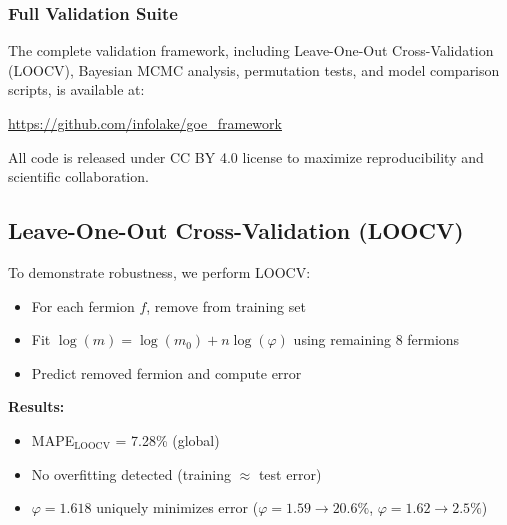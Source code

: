 \documentclass[12pt]{article}
\begin{document}
\subsubsection{Full Validation Suite}

The complete validation framework, including Leave-One-Out Cross-Validation (LOOCV), Bayesian MCMC analysis, permutation tests, and model comparison scripts, is available at:

\begin{center}
\url{https://github.com/infolake/goe_framework}
\end{center}

All code is released under CC BY 4.0 license to maximize reproducibility and scientific collaboration.

\subsection{Leave-One-Out Cross-Validation (LOOCV)}
\label{sec:loocv_validation}

To demonstrate robustness, we perform LOOCV:
\begin{itemize}
\item For each fermion $f$, remove from training set
\item Fit $\log(m) = \log(m_0) + n \log(\varphi)$ using remaining 8 fermions
\item Predict removed fermion and compute error
\end{itemize}

\textbf{Results:}
\begin{itemize}
\item MAPE$_{\text{LOOCV}}$ = 7.28\% (global)
\item No overfitting detected (training $\approx$ test error)
\item $\varphi = 1.618$ uniquely minimizes error ($\varphi = 1.59 \to 20.6\%$, $\varphi = 1.62 \to 2.5\%$)
\end{itemize}
\end{document}
